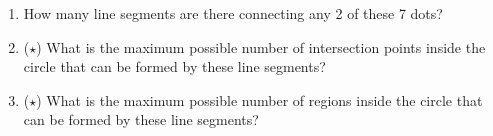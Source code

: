 \documentclass{article}
\begin{document}
\begin{enumerate}
\begin{enumerate}
\item How many line segments are there connecting any 2 of these 7 dots?\vspace{1cm}
\item ($\star$) What is the maximum possible number of intersection points inside the circle that can be formed by these line segments?\vspace{1cm}
\item ($\star$) What is the maximum possible number of regions inside the circle that can be formed by these line segments?
\end{enumerate}
\end{enumerate} 






\newpage
\end{document}
